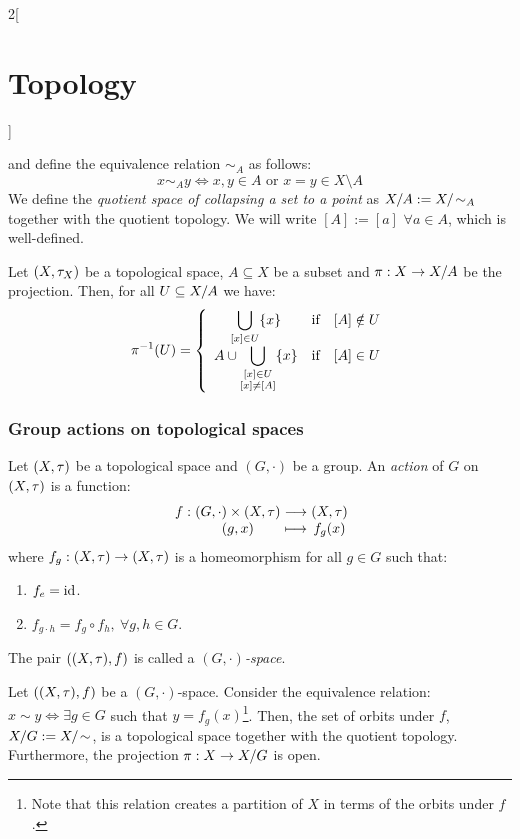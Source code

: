 \documentclass[../../../main.tex]{subfiles}
\begin{document}
\begin{multicols}{2}[\section{Topology}]
\begin{definition}
    and define the equivalence relation $\sim_A$ as follows: $$x\sim_A y\iff x,y\in A\text{ or }x=y\in X\setminus A$$
    We define the \textit{quotient space of collapsing a set to a point} as $\quot{X}{A}:=\quot{X}{\!\sim_A}$ together with the quotient topology. We will write $[A]:=[a]$ $\forall a\in A$, which is well-defined.
  \end{definition}
  \begin{prop}
    Let $(X,\tau_X)$ be a topological space, $A\subseteq X$ be a subset and $\pi:X\rightarrow\quot{X}{A}$ be the projection. Then, for all $U\subseteq\quot{X}{A}$ we have:
    $$
      \pi^{-1}(U)=\left\{\begin{array}{ccc}
        \displaystyle\bigcup_{[x]\in U}\{x\} & \text{if} & [A]\notin U \\
        \displaystyle A\cup \bigcup_{
          \begin{subarray}{c}
            [x]\in U \\
            [x]\ne [A]
          \end{subarray}
        }\{x\}                               & \text{if} & [A]\in U
      \end{array}\right.
    $$
  \end{prop}
  \subsubsection{Group actions on topological spaces}
  \begin{definition}
    Let $(X,\tau)$ be a topological space and $(G,\cdot)$ be a group. An \textit{action} of $G$ on $(X,\tau)$ is a function:
    $$\function{f}{(G,\cdot)\times(X,\topo)}{(X,\topo)}{(g,x)}{f_g(x)}$$ where $f_g:(X,\tau)\rightarrow(X,\tau)$ is a homeomorphism for all $g\in G$ such that:
    \begin{enumerate}
      \item $f_e=\mathrm{id}$.
      \item $f_{g\cdot h}=f_g\circ f_h,\ \forall g,h\in G$.
    \end{enumerate}
    The pair $((X,\tau),f)$ is called a \textit{$(G,\cdot)$-space}.
  \end{definition}
  \begin{prop}
    Let $((X,\tau),f)$ be a $(G,\cdot)$-space. Consider the equivalence relation: $x\sim y\iff\exists g\in G$ such that $y=f_g(x)$\footnote{Note that this relation creates a partition of $X$ in terms of the orbits under $f$.}. Then, the set of orbits under $f$, $\quot{X}{G}:=\quot{X}{\!\sim}$, is a topological space together with the quotient topology. Furthermore, the projection $\pi:X\rightarrow\quot{X}{G}$ is open.
  \end{prop}

\end{multicols}
\end{document}
